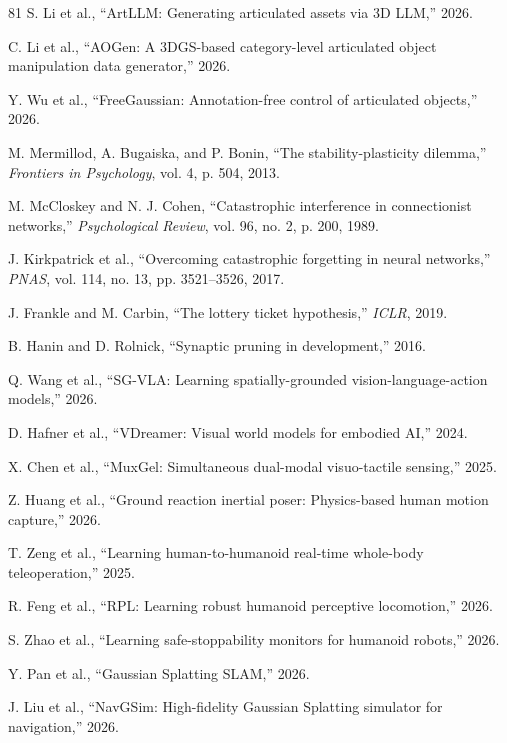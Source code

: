 \documentclass[journal]{IEEEtran}
\begin{document}
\begin{thebibliography}{81}
 S. Li et al., ``ArtLLM: Generating articulated assets via 3D LLM,'' 2026.

 C. Li et al., ``AOGen: A 3DGS-based category-level articulated object manipulation data generator,'' 2026.

 Y. Wu et al., ``FreeGaussian: Annotation-free control of articulated objects,'' 2026.

 M. Mermillod, A. Bugaiska, and P. Bonin, ``The stability-plasticity dilemma,'' \textit{Frontiers in Psychology}, vol. 4, p. 504, 2013.

 M. McCloskey and N. J. Cohen, ``Catastrophic interference in connectionist networks,'' \textit{Psychological Review}, vol. 96, no. 2, p. 200, 1989.

 J. Kirkpatrick et al., ``Overcoming catastrophic forgetting in neural networks,'' \textit{PNAS}, vol. 114, no. 13, pp. 3521--3526, 2017.

 J. Frankle and M. Carbin, ``The lottery ticket hypothesis,'' \textit{ICLR}, 2019.

 B. Hanin and D. Rolnick, ``Synaptic pruning in development,'' 2016.

 Q. Wang et al., ``SG-VLA: Learning spatially-grounded vision-language-action models,'' 2026.

 D. Hafner et al., ``VDreamer: Visual world models for embodied AI,'' 2024.

 X. Chen et al., ``MuxGel: Simultaneous dual-modal visuo-tactile sensing,'' 2025.

 Z. Huang et al., ``Ground reaction inertial poser: Physics-based human motion capture,'' 2026.

 T. Zeng et al., ``Learning human-to-humanoid real-time whole-body teleoperation,'' 2025.

 R. Feng et al., ``RPL: Learning robust humanoid perceptive locomotion,'' 2026.

 S. Zhao et al., ``Learning safe-stoppability monitors for humanoid robots,'' 2026.

 Y. Pan et al., ``Gaussian Splatting SLAM,'' 2026.

 J. Liu et al., ``NavGSim: High-fidelity Gaussian Splatting simulator for navigation,'' 2026.


\end{thebibliography}
\end{document}

